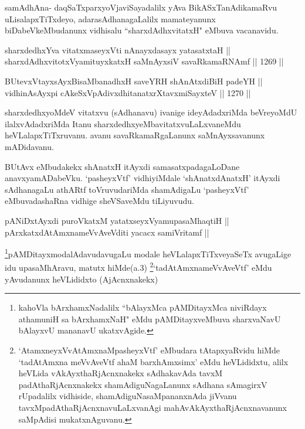 \begin{artha}
samAdhAna- daqSaTxparxyoVjaviSayadalilx yAva BikASxTanAdikamaRvu uLisalapxTiTxdeyo, adarasAdhanagaLalilx mamateyanunx biDabeVkeMbudanunx vidhisalu ``sharxdAdhxvitatxH" eMbuva vacanavidu.
\end{artha}

\begin{shl}
sharxdedhxYva vitatxmaseyxVti nAnayxdasayx yatasatxtaH || \\
sharxdAdhxvitotxV\s yamituyxkatxH saMnAyxsiV savaRkamaRNAmf \hfill || 1269 ||  
\end{shl}
				
\begin{shl}
BUtevxVtayxsAyxBisaMbanadhxH saveYRH shAnAtxdiBiH padeYH || \\
vidhinA\s sAyxpi cA\s \s keSxVpAdivxdhitanatxrXtavxmiSayxteV \hfill || 1270 ||  
\end{shl}

\begin{artha}
sharxdedhxyoMdeV vitatxvu (sAdhanavu) ivanige ideyAdadxriMda beVreyoMdU ilalxvAdadxriMda Itanu sharxdedhxyeMbavitatxvuLaLxvaneMdu heVLalapxTiTxruvanu. avanu savaRkamaRgaLanunx saMnAyxsavanunx mADidavanu.
\end{artha}

\begin{artha}
BUtAvx eMbudakekx shAnatxH itAyxdi samasatxpadagaLoDane anavxyamADabeVku. `pasheyxVtf' vidhiyiMdale `shAnatxdAnatxH' itAyxdi sAdhanagaLu athARtf toVruvudariMda shamAdigaLu `pasheyxVtf' eMbuvadashaRna vidhige sheVSaveMdu tiLiyuvudu.
\end{artha}


\begin{shl}
pANiDxtAyxdi puroVkatxM yatatxseyxVyamupasaMhaqtiH || \\
pArxkatxdAtAmxnameVvAveVditi yacacx samiVritamf ||
\end{shl}

\begin{artha}
\footnote{kahoVla bArxhamxNadalilx ``bAlayxMca pAMDitayxMca niviRdayx athamuniH sa bArxhamxNaH" eMdu pAMDitayxveMbuva sharxvaNavU bAlayxvU mananavU ukatxvAgide.}pAMDitayxmodalAdavudavugaLu modale heVLalapxTiTxveyaSeTx avugaLige idu upasaMhAravu, matutx hiMde(a.3) \footnote{`AtamxneyxVvA\s \s tAmxnaMpasheyxVtf' eMbudara tAtapxyaRvidu hiMde `tadAtAmxna meVvAveVtf ahaM barxhAmxsimx' eMdu heVLididxtu, alilx heVLida vAkAyxthaRjAcnxnakekx sAdhakavAda tavxM padAthaRjAcnxnakekx shamAdiguNagaLanunx sAdhana sAmagirxV rUpadalilx vidhiside, shamAdiguNasaMpananxnAda jiVvanu tavxMpadAthaRjAcnxnavuLaLxvanAgi mahAvAkAyxthaRjAcnxnavanunx saMpAdisi mukatxnAguvanu.}`tadAtAmxnameVvAveVtf' eMdu yAvudanunx heVLididxto (AjAcnxnakekx)
\end{artha}

